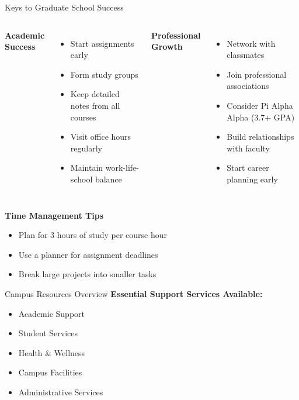 \documentclass[10pt]{beamer}
\begin{document}
\begin{frame}{Keys to Graduate School Success}
    \begin{columns}[t]
    \textbf{Academic Success}
    \begin{itemize}
    \item Start assignments early
    \item Form study groups
    \item Keep detailed notes from all courses
    \item Visit office hours regularly
    \item Maintain work-life-school balance
    \end{itemize}
    
    \textbf{Professional Growth}
    \begin{itemize}
    \item Network with classmates
    \item Join professional associations
    \item Consider Pi Alpha Alpha (3.7+ GPA)
    \item Build relationships with faculty
    \item Start career planning early
    \end{itemize}
    \end{columns}
    
    \vspace{0.5em}
    \textbf{Time Management Tips}
    \begin{itemize}
    \item Plan for 3 hours of study per course hour
    \item Use a planner for assignment deadlines
    \item Break large projects into smaller tasks
    \end{itemize}
    \end{frame}
    
    
\begin{frame}{Campus Resources Overview}
    \textbf{Essential Support Services Available:}
    \begin{itemize}
    \item Academic Support
    \item Student Services
    \item Health \& Wellness
    \item Campus Facilities
    \item Administrative Services
    \end{itemize}
        \end{frame}
    
\end{document}
